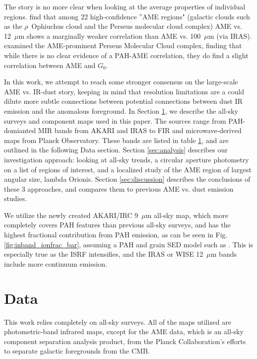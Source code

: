 \documentclass[preprint2,longabstract]{aastex}
\begin{document}
     The story is no more clear when looking at the average properties of individual regions. \cite{planckXV} find that among 22 high-confidence ''AME regions" (galactic clouds such as the $\rho$~Ophiuchus cloud and the Perseus molecular cloud complex) AME vs. 12~$\mu$m  shows a marginally weaker correlation than AME vs. 100~$\mu$m (via IRAS). \cite{tibbs11} examined the AME-prominent Perseus Molecular Cloud complex, finding that while there is no clear evidence of a PAH-AME correlation, they do find a slight correlation between AME and  $G_0$.

     In this work, we attempt to reach some stronger consensus on the large-scale AME vs. IR-dust story, keeping in mind that resolution limitations are a could dilute more subtle connections between potential connections between dust IR emission and the anomalous foreground. In Section \ref{sec:data}, we describe the all-sky surveys and component maps used in this paper. The sources range from PAH-domianted MIR bands from AKARI and IRAS to FIR and microwave-derived maps from Planck Observatory. These bands are listed in table \ref{sec:data}, and are outlined in the following Data section. Section  \ref{sec:analysis} describes our investigation approach: looking at all-sky trends, a circular aperture photometry on a list of regions of interest, and a localized study of the AME region of largest angular size, lambda Orionis. Section \ref{sec:discussion} describes the conclusions of these 3 approaches, and compares them to previous AME vs. dust emission studies.

    We utilize the newly created AKARI/IRC 9~$\mu$m all-sky map, which more completely covers PAH features than previous all-sky surveys, and has the highest fractional contribution from PAH emission, as can be seen in Fig. \ref{fig:inband_ionfrac_bar}, assuming a PAH and grain SED model such as \cite{draine01}. This is especially true as the ISRF intensifies, and the IRAS or WISE 12~$\mu$m bands include more continuum emission.


\section{Data}
\label{sec:data}

This work relies completely on all-sky surveys. All of the maps utilized are photometric-band infrared maps, except for the AME data, which is an all-sky component separation analysis product, from the Planck Collaboration's efforts to separate galactic foregrounds from the CMB.
\end{document}
